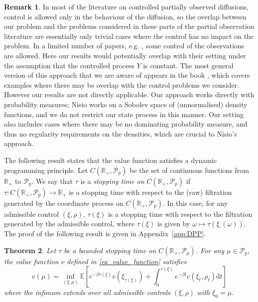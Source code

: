 \documentclass{article}
\newtheorem{theorem}{Theorem}[section]
\theoremstyle{definition}
\newtheorem{remark}[theorem]{\textbf{Remark}}
\numberwithin{equation}{section}
\numberwithin{theorem}{section}
\newcommand{\E}{\mathbb{E}}
\newcommand{\R}{\mathbb{R}}
\newcommand{\dt}{\mathrm{d}t}
\newcommand{\Pcal}{{\mathcal P}}
\begin{document}
\begin{remark}
In most of the literature on controlled partially observed diffusions, control is allowed only in the behaviour of the diffusion, so the overlap between our problem and the problems considered in these parts of the partial observation literature are essentially only trivial cases where the control has no impact on the problem. In a limited number of papers, e.g. \cite{bandini_backward_2018}, some control of the observations are allowed. Here our results would potentially overlap with their setting under the assumption that the controlled process $Y$ is constant. The most general version of this approach that we are aware of appears in the book \cite{nisio_book_2015}, which covers examples where there may be overlap with the control problems we consider. However our results are not directly applicable. Our approach works directly with probability measures; Nisio works on a Sobolev space of (unnormalised) density functions, and we do not restrict our state process in this manner. Our setting also includes cases where there may be no dominating probability measure, and thus no regularity requirements on the densities, which are crucial to Nisio's approach.
\end{remark}

The following result states that the value function satisfies a dynamic programming principle. Let $C(\R_+,\Pcal_p)$ be the set of continuous functions from $\R_+$ to $\Pcal_p$. We say that $\tau$ is a \emph{stopping time on $C(\R_+,\Pcal_p)$} if $\tau\colon{C(\R_+,\Pcal_p)}\to\R_+$ is a stopping time with respect to the (raw) filtration generated by the coordinate process on $C(\R_+,\Pcal_p)$. In this case, for any admissible control $(\xi,\rho)$, $\tau(\xi)$ is a stopping time with respect to the filtration generated by the admissible control, where $\tau(\xi)$ is given by $\omega\mapsto\tau(\xi_\cdot(\omega))$. The proof of the following result is given in Appendix~\ref{app:DPP}.

\begin{theorem}\label{thm_dpp_main_text}
Let $\tau$ be a bounded stopping time on $C(\R_+,\Pcal_p)$. For any $\mu\in\Pcal_p$, the value function $v$ defined in \eqref{eq_value_function} satisfies
$$v(\mu) = \inf_{(\xi,\rho)} \E\left[ e^{-\beta\tau(\xi)}v(\xi_{\tau(\xi)}) + \int_0^{\tau(\xi)} e^{-\beta t}c(\xi_t,\rho_t) \dt \right]$$
where the infimum extends over all admissible controls $(\xi,\rho)$ with $\xi_0=\mu$.
\end{theorem}
\end{document}
